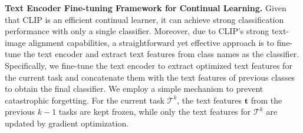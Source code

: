 \documentclass{article}
\theoremstyle{plain}
\theoremstyle{definition}
\theoremstyle{remark}
\begin{document}
\textbf{Text Encoder Fine-tuning Framework for Continual Learning.} 
Given that CLIP is an efficient continual learner, it can achieve strong classification performance with only a single classifier. Moreover, due to CLIP’s strong text-image alignment capabilities, a straightforward yet effective approach is to fine-tune the text encoder and extract text features from class names as the classifier.
Specifically, we fine-tune the text encoder to extract optimized text features for the current task and concatenate them with the text features of previous classes to obtain the final classifier. We employ a simple mechanism to prevent catastrophic forgetting. For the current task $\mathcal{T}^{k}$, the text features $\boldsymbol{t}$ from the previous $k-1$ tasks are kept frozen, while only the text features for $\mathcal{T}^{k}$ are updated by gradient optimization.
\end{document}
